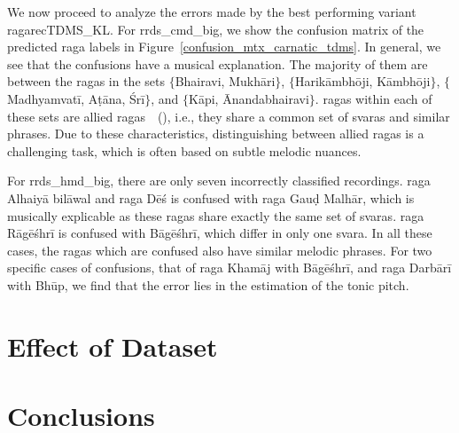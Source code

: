 We now proceed to analyze the errors made by the best performing variant \acrshort{ragarecTDMS_KL}. For \acrshort{rrds_cmd_big}, we show the confusion matrix of the predicted \gls{raga} labels in Figure~\ref{confusion_mtx_carnatic_tdms}. In general, we see that the confusions have a musical explanation. The majority of them are between the \glspl{raga} in the sets $\lbrace$Bhairavi, Mukh\={a}ri$\rbrace$, $\lbrace$Harik\={a}mbh\={o}ji, K\={a}mbh\={o}ji$\rbrace$, $\lbrace$Madhyamvat\={i}, A\d{t}\={a}na, \'Sr\={i}$\rbrace$, and $\lbrace$K\={a}pi, \={A}nandabhairavi$\rbrace$. \Glspl{raga} within each of these sets are allied \glspl{raga}~\citep{Viswanathan2004}~(), i.e., they share a common set of \glspl{svara} and similar phrases. Due to these characteristics, distinguishing between allied \glspl{raga} is a challenging task, which is often based on subtle melodic nuances.

For \acrshort{rrds_hmd_big}, there are only seven incorrectly classified recordings. \Gls{raga} Alhaiy\={a} bil\={a}wal and \gls{raga} D\={e}\'{s} is confused with \gls{raga} Gau\d{d} Malh\={a}r, which is musically explicable as these \glspl{raga} share exactly the same set of \glspl{svara}. \Gls{raga} R\={a}g\={e}\'{s}hr\={i} is confused with B\={a}g\={e}\'{s}hr\={i}, which differ in only one \gls{svara}. In all these cases, the \glspl{raga} which are confused also have similar melodic phrases. For two specific cases of confusions, that of \gls{raga}  Kham\={a}j with B\={a}g\={e}\'{s}hr\={i}, and \gls{raga} Darb\={a}r\={i} with Bh\={u}p, we find that the error lies in the estimation of the tonic pitch.


\section{Effect of Dataset}
\label{sec:ragarec_dataset_effect}



\section{Conclusions}
\label{sec:conclusions_raga_recognition}

